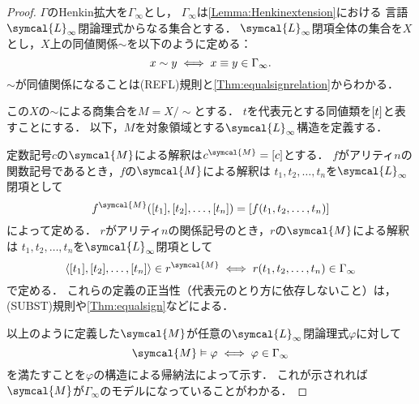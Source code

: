 \begin{proof}
	\(\Gamma\)のHenkin拡大を\(\Gamma_\infty\)とし，
	\(\Gamma_\infty\)は\cref{Lemma:Henkinextension}における
	言語\(\symcal{L}_\infty\)閉論理式からなる集合とする．
	\(\symcal{L}_\infty\)閉項全体の集合を\(X\)とし，\(X\)上の同値関係\(\sim\)を以下のように定める：
	\begin{equation*}
		x \sim y \iff x \equiv y \in \Gamma_\infty.
	\end{equation*}
	\(\sim\)が同値関係になることは(REFL)規則と\cref{Thm:equalsignrelation}からわかる．

	この\(X\)の\(\sim\)による商集合を\(M = X / {\sim}\)とする．
	\(t\)を代表元とする同値類を\(\equivclass{t}\)と表すことにする．
	以下，\(M\)を対象領域とする\(\symcal{L}_\infty\)構造を定義する．

	定数記号\(c\)の\(\symcal{M}\)による解釈は\(\interpretation{\symcal{M}}{c} = \equivclass{c}\)とする．
	\(f\)がアリティ\(n\)の関数記号であるとき，\(f\)の\(\symcal{M}\)による解釈は
	\(t_1, t_2, \dots, t_n\)を\(\symcal{L}_\infty\)閉項として
	\[
		\apply{\interpretation{\symcal{M}}{f}}{\equivclass{t_1}, \equivclass{t_2}, \dots, \equivclass{t_n}}
		=
		\equivclass{\apply{f}{t_1, t_2, \dots, t_n}}
	\]
	によって定める．
	\(r\)がアリティ\(n\)の関係記号のとき，\(r\)の\(\symcal{M}\)による解釈は
	\(t_1, t_2, \dots, t_n\)を\(\symcal{L}_\infty\)閉項として
	\[
		\pair{\equivclass{t_1}, \equivclass{t_2}, \dots, \equivclass{t_n}} \in \interpretation{\symcal{M}}{r}
		\metaequivalent
		\apply{r}{t_1, t_2, \dots, t_n} \in \Gamma_\infty
	\]
	で定める．
	これらの定義の正当性（代表元のとり方に依存しないこと）は，(SUBST)規則や\cref{Thm:equalsign}などによる．

	以上のように定義した\(\symcal{M}\)が任意の\(\symcal{L}_\infty\)閉論理式\(\varphi\)に対して
	\begin{equation}
		\symcal{M} \satisfy \varphi \metaequivalent \varphi \in \Gamma_\infty
		\label{eq:henkintarget}
	\end{equation}
	を満たすことを\(\varphi\)の構造による帰納法によって示す．
	これが示されれば\(\symcal{M}\)が\(\Gamma_\infty\)のモデルになっていることがわかる．


\end{proof}
